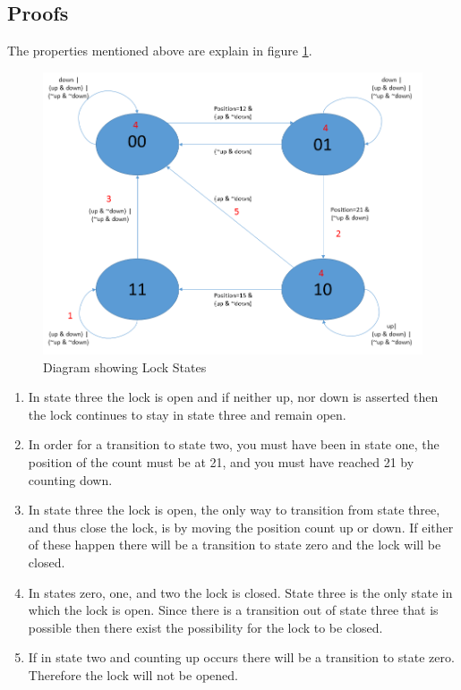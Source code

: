 \documentclass[11pt]{article}
\begin{document}
\subsection{Proofs}
The properties mentioned above are explain in figure \ref{p1_p}.

	\begin{figure}[h]\centering
	\includegraphics[height=0.45\textwidth]{images/p1_proof.png}
	\caption{Diagram showing Lock States}
		\label{p1_p}
	\end{figure}

\begin{enumerate}
\item In state three the lock is open and if neither up, nor down is asserted then the lock continues to stay in state three and remain open.
\item In order for a transition to state two, you must have been in state one, the position of the count must be at 21, and you must have reached 21 by counting down.
\item In state three the lock is open, the only way to transition from state three, and thus close the lock, is by moving the position count up or down. If either of these happen there will be a transition to state zero and the lock will be closed.
\item In states zero, one, and two the lock is closed. State three is the only state in which the lock is open. Since there is a transition out of state three that is possible then there exist the possibility for the lock to be closed.
\item If in state two and counting up occurs there will be a transition to state zero. Therefore the lock will not be opened. 
\end{enumerate}	

	
\end{document}
